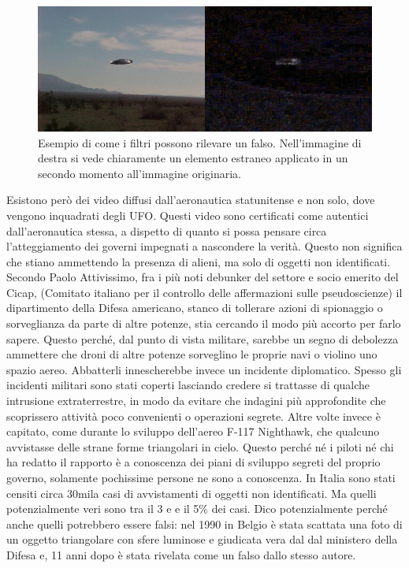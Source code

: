 \documentclass[12pt]{book} %
\begin{document}
\begin{figure}[H]
  \begin{minipage}{17cm}
    \includegraphics[width=17cm]{images/Libro-img053.jpg}
    \caption{Esempio di come i filtri possono rilevare un falso. Nell'immagine di destra si vede chiaramente un elemento estraneo applicato in un secondo momento all'immagine originaria.}
  \end{minipage}
\end{figure}

Esistono però dei video diffusi dall'aeronautica statunitense e non solo, dove vengono inquadrati
degli UFO. Questi video sono certificati come autentici dall'aeronautica stessa, a dispetto di
quanto si possa pensare circa l'atteggiamento dei governi impegnati a nascondere la verità. Questo
non significa che stiano ammettendo la presenza di alieni, ma solo di oggetti non identificati. Secondo Paolo
Attivissimo, fra i più noti debunker del settore e socio emerito del Cicap, (Comitato italiano per il controllo delle
affermazioni sulle pseudoscienze) il dipartimento della Difesa americano, stanco di tollerare azioni di spionaggio o
sorveglianza da parte di altre potenze, stia cercando il modo più accorto per farlo sapere. Questo perché, dal punto di
vista militare, sarebbe un segno di debolezza ammettere che droni di altre potenze sorveglino le proprie navi o violino
uno spazio aereo. Abbatterli innescherebbe invece un incidente diplomatico. Spesso gli incidenti militari sono stati
coperti lasciando credere si trattasse di qualche intrusione extraterrestre, in modo da evitare che indagini più
approfondite che scoprissero attività poco convenienti o operazioni segrete. Altre volte invece è capitato, come
durante lo sviluppo dell'aereo F-117 Nighthawk, che qualcuno avvistasse delle strane forme
triangolari in cielo. Questo perché né i piloti né chi ha redatto il rapporto è a conoscenza dei piani di sviluppo
segreti del proprio governo, solamente pochissime persone ne sono a conoscenza. In Italia sono stati censiti circa
30mila casi di avvistamenti di oggetti non identificati. Ma quelli potenzialmente veri sono tra il 3 e e il 5\% dei
casi. Dico potenzialmente perché anche quelli potrebbero essere falsi: nel 1990 in Belgio è stata scattata una foto di
un oggetto triangolare con sfere luminose e giudicata vera dal dal ministero della Difesa e, 11 anni dopo è stata
rivelata come un falso dallo stesso autore.
\end{document}
